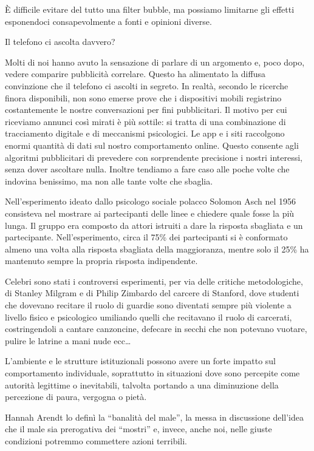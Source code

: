 \documentclass[12pt]{book} %
\begin{document}
È difficile evitare del tutto una filter bubble, ma possiamo limitarne gli effetti esponendoci consapevolmente a fonti e opinioni diverse.

\begin{mdframed}[linewidth=1pt]
Il telefono ci ascolta davvero?

Molti di noi hanno avuto la sensazione di parlare di un argomento e, poco dopo, vedere comparire pubblicità correlare. Questo ha alimentato la diffusa convinzione che il telefono ci ascolti in segreto. In realtà, secondo le ricerche finora disponibili, non sono emerse prove che i dispositivi mobili registrino costantemente le nostre conversazioni per fini pubblicitari. Il motivo per cui riceviamo annunci così mirati è più sottile: si tratta di una combinazione di tracciamento digitale e di meccanismi psicologici. Le app e i siti raccolgono enormi quantità di dati sul nostro comportamento online. Questo consente agli algoritmi pubblicitari di prevedere con sorprendente precisione i nostri interessi, senza dover ascoltare nulla. Inoltre tendiamo a fare caso alle poche volte che indovina benissimo, ma non alle tante volte che sbaglia.
\end{mdframed}

Nell'esperimento ideato dallo psicologo sociale polacco Solomon Asch nel 1956 consisteva nel mostrare ai partecipanti delle linee e chiedere quale fosse la più lunga. Il gruppo era composto da attori istruiti a dare la
risposta sbagliata e un partecipante. Nell'esperimento, circa il 75\% dei partecipanti si è conformato almeno una volta alla risposta sbagliata della maggioranza, mentre solo il 25\% ha mantenuto sempre la propria risposta indipendente.

Celebri sono stati i controversi esperimenti, per via delle critiche metodologiche, di Stanley Milgram e di Philip Zimbardo del carcere di Stanford, dove studenti che dovevano recitare il ruolo di guardie sono diventati sempre più violente a livello fisico e psicologico umiliando quelli che recitavano il ruolo di carcerati, costringendoli a cantare canzoncine, defecare in secchi che non potevano vuotare, pulire le latrine a mani nude ecc… 

L’ambiente e le strutture istituzionali possono avere un forte impatto sul comportamento individuale, soprattutto in situazioni dove sono percepite come autorità legittime o inevitabili, talvolta portando a una diminuzione della percezione di paura, vergogna o pietà.

Hannah Arendt lo definì la “banalità del male”, la messa in discussione dell'idea che il male sia prerogativa dei “mostri” e, invece, anche noi, nelle giuste condizioni potremmo commettere azioni terribili. 
\end{document}
